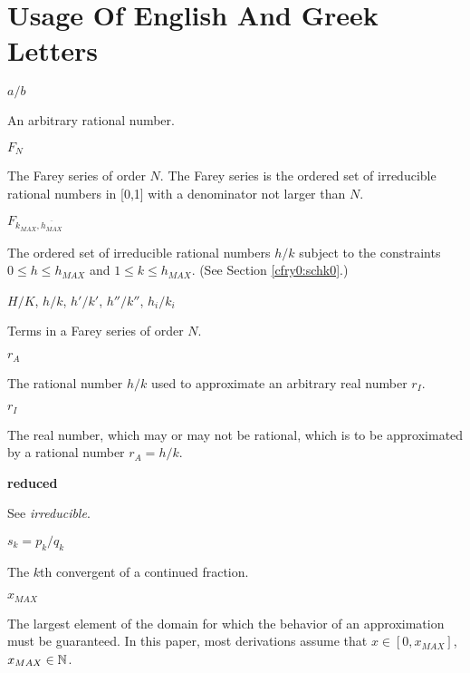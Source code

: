 
\section*{Usage Of English And Greek Letters}

\begin{vworkmathtermglossaryenum}

\item \mbox {\boldmath $a/b$}

      An arbitrary rational number.

\item \mbox {\boldmath $ F_N $}

      The Farey 
      series of order $N$.  The Farey series is the
      ordered set of irreducible rational numbers 
	  in [0,1] with a
      denominator not larger than $N$.

\item \mbox {\boldmath $F_{k_{MAX}, \overline{h_{MAX}}}$}
      
	  The ordered set of irreducible rational numbers
	  $h/k$ subject to the constraints $0 \leq h \leq h_{MAX}$
	  and $1 \leq k \leq h_{MAX}$.  
	  (See Section \ref{cfry0:schk0}.)


\item \mbox{\boldmath $H/K$}, \mbox{\boldmath $h/k$},
      \mbox{\boldmath $h'/k'$}, \mbox{\boldmath $h''/k''$},
      \mbox{\boldmath $h_i/k_i$}

      Terms in a Farey series of order $N$.

\item \mbox{\boldmath $r_A$}

      The rational number $h/k$ used to approximate
      an arbitrary real number $r_I$.

\item \mbox{\boldmath $r_I$}

      The real number, which may or may not be rational,
      which is to be approximated by a rational number
      $r_A = h/k$.

\item \textbf{reduced}

      See \emph{irreducible}.

\item \mbox{\boldmath $s_k = p_k/q_k$}

      The $k$th convergent of a continued fraction.

\item \mbox{\boldmath $x_{MAX}$}

      The largest element of the domain for which the
      behavior of an approximation must be guaranteed.
      In this paper, most derivations assume
      that $x \in [0, x_{MAX}]$, $x_{MAX} \in {\mathbb{N}}{}$.
\end{vworkmathtermglossaryenum}

